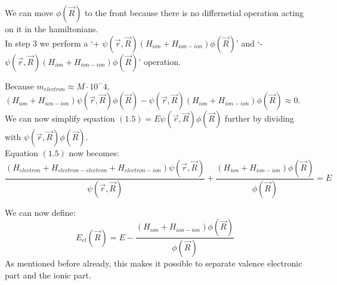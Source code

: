 \documentclass{report}
\begin{document}
We can move $\phi(\vec{R})$ to the front because there is no differnetial operation acting on it in the hamiltonians.\\
In step 3 we perform a `+ $\psi(\vec{r}, \vec{R})(H_{ion} + H_{ion - ion})\phi(\vec{R})$' and `- $\psi(\vec{r}, \vec{R})(H_{ion} + H_{ion - ion})\phi(\vec{R})$' operation. \par
Because $m_{electron} \approx M \cdot 10^-4$, $(H_{ion} + H_{ion - ion})\psi(\vec{r}, \vec{R})\phi(\vec{R}) - \psi(\vec{r}, \vec{R})(H_{ion} + H_{ion - ion})\phi(\vec{R}) \approx 0$.
We can now simplify equation $ (1.5) = E\psi(\vec{r}, \vec{R})\phi(\vec{R}) $ further by dividing with $ \psi(\vec{r}, \vec{R})\phi(\vec{R}) $. \\
Equation $(1.5)$ now becomes:
\begin{equation}
	\frac{(H_{electron} + H_{electron - electron} + H_{electron - ion})\psi(\vec{r}, \vec{R})}{\psi(\vec{r}, \vec{R})} + \frac{(H_{ion} + H_{ion - ion})\phi(\vec{R})}{\phi(\vec{R})} = E
\end{equation}
 \par
We can now define: 
\begin{equation}
	E_{el}(\vec{R}) = E - \frac{(H_{ion} + H_{ion - ion})\phi(\vec{R})}{\phi(\vec{R})}
\end{equation}
As mentioned before already, this makes it possible to separate valence electronic part and the ionic part.
\end{document}
